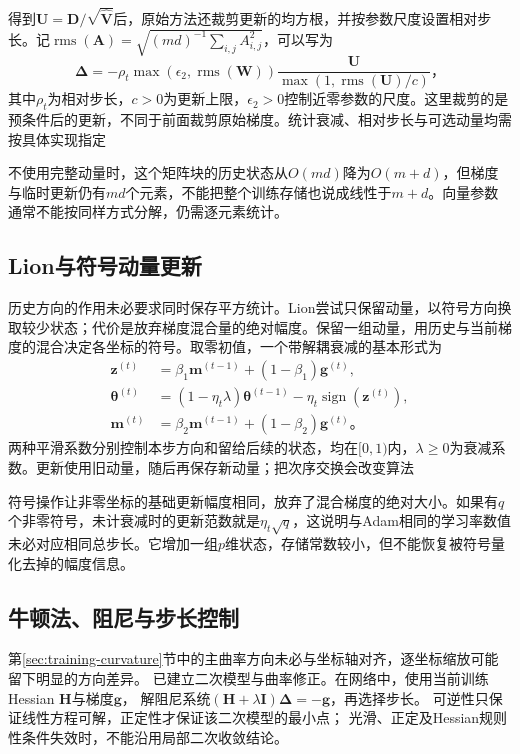得到$\bm U=\bm D/\sqrt{\hat{\bm V}}$后，原始方法还裁剪更新的均方根，并按参数尺度设置相对步长。记$\operatorname{rms}(\bm A)=\sqrt{(md)^{-1}\sum_{i,j}A_{i,j}^2}$，可以写为
\begin{equation}
  \bm\Delta=-\rho_t\max(\epsilon_2,\operatorname{rms}(\bm W))
    \frac{\bm U}{\max(1,\operatorname{rms}(\bm U)/c)}\text{，}
  \label{eq:training-adafactor-update}
\end{equation}
其中$\rho_t$为相对步长，$c>0$为更新上限，$\epsilon_2>0$控制近零参数的尺度。这里裁剪的是预条件后的更新，不同于前面裁剪原始梯度。统计衰减、相对步长与可选动量均需按具体实现指定

不使用完整动量时，这个矩阵块的历史状态从$O(md)$降为$O(m+d)$，但梯度与临时更新仍有$md$个元素，不能把整个训练存储也说成线性于$m+d$。向量参数通常不能按同样方式分解，仍需逐元素统计。

\subsection{Lion与符号动量更新}
\label{sec:training-lion}

历史方向的作用未必要求同时保存平方统计。Lion尝试只保留动量，以符号方向换取较少状态；代价是放弃梯度混合量的绝对幅度。保留一组动量，用历史与当前梯度的混合决定各坐标的符号。取零初值，一个带解耦衰减的基本形式为
\begin{align}
  \bm z^{(t)}&=\beta_1\bm m^{(t-1)}+(1-\beta_1)\bm g^{(t)},\\
  \bm\theta^{(t)}&=(1-\eta_t\lambda)\bm\theta^{(t-1)}
      -\eta_t\operatorname{sign}(\bm z^{(t)}),\\
  \bm m^{(t)}&=\beta_2\bm m^{(t-1)}+(1-\beta_2)\bm g^{(t)}\text{。}
  \label{eq:training-lion}
\end{align}
两种平滑系数分别控制本步方向和留给后续的状态，均在$[0,1)$内，$\lambda\geq0$为衰减系数。更新使用旧动量，随后再保存新动量；把次序交换会改变算法

符号操作让非零坐标的基础更新幅度相同，放弃了混合梯度的绝对大小。如果有$q$个非零符号，未计衰减时的更新范数就是$\eta_t\sqrt q$，这说明与Adam相同的学习率数值未必对应相同总步长。它增加一组$p$维状态，存储常数较小，但不能恢复被符号量化去掉的幅度信息。

\subsection{牛顿法、阻尼与步长控制}
\label{sec:training-second-order}

第\ref{sec:training-curvature}节中的主曲率方向未必与坐标轴对齐，逐坐标缩放可能留下明显的方向差异。
已建立二次模型与曲率修正。在网络中，使用当前训练Hessian $\bm H$与梯度$\bm g$，
解阻尼系统$(\bm H+\lambda\bm I)\bm\Delta=-\bm g$，再选择步长。
可逆性只保证线性方程可解，正定性才保证该二次模型的最小点；
光滑、正定及Hessian规则性条件失效时，不能沿用局部二次收敛结论。

